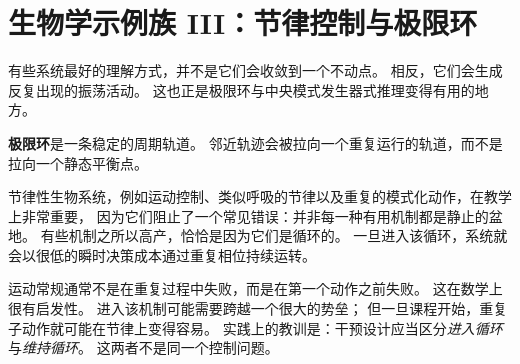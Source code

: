 \section{生物学示例族 III：节律控制与极限环}

有些系统最好的理解方式，并不是它们会收敛到一个不动点。
相反，它们会生成反复出现的振荡活动。
这也正是极限环与中央模式发生器式推理变得有用的地方。

\begin{definition}[极限环]
\textbf{极限环}是一条稳定的周期轨道。
邻近轨迹会被拉向一个重复运行的轨道，而不是拉向一个静态平衡点。
\end{definition}

\begin{discussion}
节律性生物系统，例如运动控制、类似呼吸的节律以及重复的模式化动作，在教学上非常重要，
因为它们阻止了一个常见错误：并非每一种有用机制都是静止的盆地。
有些机制之所以高产，恰恰是因为它们是循环的。
一旦进入该循环，系统就会以很低的瞬时决策成本通过重复相位持续运转。
\end{discussion}

\begin{example}[把运动常规看作进入一个循环]
运动常规通常不是在重复过程中失败，而是在第一个动作之前失败。
这在数学上很有启发性。
进入该机制可能需要跨越一个很大的势垒；
但一旦课程开始，重复子动作就可能在节律上变得容易。
实践上的教训是：干预设计应当区分\emph{进入循环}与\emph{维持循环}。
这两者不是同一个控制问题。
\end{example}